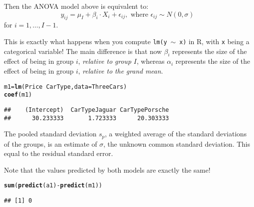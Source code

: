 \documentclass[10pt]{article}\usepackage[]{graphicx}\usepackage[]{color}
\makeatletter
\newcommand{\hlopt}[1]{\textcolor[rgb]{0,0,0}{#1}}%
\newcommand{\hlstd}[1]{\textcolor[rgb]{0.345,0.345,0.345}{#1}}%
\newcommand{\hlkwb}[1]{\textcolor[rgb]{0.69,0.353,0.396}{#1}}%
\newcommand{\hlkwc}[1]{\textcolor[rgb]{0.333,0.667,0.333}{#1}}%
\newcommand{\hlkwd}[1]{\textcolor[rgb]{0.737,0.353,0.396}{\textbf{#1}}}%
\newenvironment{kframe}{%
 \def\at@end@of@kframe{}%
 \ifinner\ifhmode%
  \def\at@end@of@kframe{\end{minipage}}%
  \begin{minipage}{\columnwidth}%
 \fi\fi%
 \def\FrameCommand##1{\hskip\@totalleftmargin \hskip-\fboxsep
 \colorbox{shadecolor}{##1}\hskip-\fboxsep
     \hskip-\linewidth \hskip-\@totalleftmargin \hskip\columnwidth}%
 \MakeFramed {\advance\hsize-\width
   \@totalleftmargin\z@ \linewidth\hsize
   \@setminipage}}%
 {\par\unskip\endMakeFramed%
 \at@end@of@kframe}
\newenvironment{knitrout}{}{} %
\makeatother
\begin{document}
Then the ANOVA model above is equivalent to:
  $$
    y_{ij} = \mu_I + \beta_i \cdot X_i + \epsilon_{ij}, \text{ where } \epsilon_{ij} \sim N(0, \sigma)
  $$
  for $i=1,\ldots,I-1$. 
  
This is exactly what happens when you compute {\tt lm(y $\sim$ x)} in R, with {\tt x} being a categorical variable! The main difference is that now $\beta_i$ represents the size of the effect of being in group $i$, \emph{relative to group $I$}, whereas $\alpha_i$ represents the size of the effect of being in group $i$, \emph{relative to the grand mean}. 

\begin{knitrout}\footnotesize
{}\color{fgcolor}\begin{kframe}
\begin{alltt}
\hlstd{m1} \hlkwb{=} \hlkwd{lm}\hlstd{(Price} \hlopt{~} \hlstd{CarType,} \hlkwc{data}\hlstd{=ThreeCars)}
\hlkwd{coef}\hlstd{(m1)}
\end{alltt}
\begin{verbatim}
##    (Intercept)  CarTypeJaguar CarTypePorsche 
##      30.233333       1.723333      20.303333
\end{verbatim}
\end{kframe}
\end{knitrout}


The pooled standard deviation $s_p$, a weighted average of the standard deviations of the groups, is an estimate of $\sigma$, the unknown common standard deviation. This equal to the residual standard error. 

Note that the values predicted by both models are exactly the same!

\begin{knitrout}\footnotesize
{}\color{fgcolor}\begin{kframe}
\begin{alltt}
\hlkwd{sum}\hlstd{(}\hlkwd{predict}\hlstd{(a1)} \hlopt{-} \hlkwd{predict}\hlstd{(m1))}
\end{alltt}
\begin{verbatim}
## [1] 0
\end{verbatim}
\end{kframe}
\end{knitrout}

\end{document}
